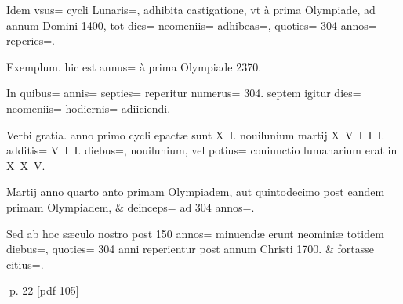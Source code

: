 \begin{parnumbers}
Idem vsus= cycli Lunaris=, adhibita castigatione, vt à prima Olympiade, ad annum Domini 1400, tot dies= neomeniis= adhibeas=, quoties= 304 annos= reperies=.

Exemplum. hic est annus= à prima Olympiade 2370.

In quibus= annis= septies= reperitur  numerus= 304. septem igitur dies= neomeniis= hodiernis= adiiciendi.

Verbi gratia. anno primo cycli epactæ sunt X I. nouilunium martij X V I I I. additis= V I I. diebus=, nouilunium, vel potius= coniunctio lumanarium erat in X X V.

Martij anno quarto anto primam Olympiadem, aut quintodecimo post eandem primam Olympiadem, \& deinceps= ad 304 annos=.

Sed ab hoc sæculo nostro post 150 annos= minuendæ erunt neominiæ totidem diebus=, quoties= 304 anni reperientur post annum Christi 1700. \& fortasse citius=.

\end{parnumbers}
\clearpage
p. 22 [pdf 105]

